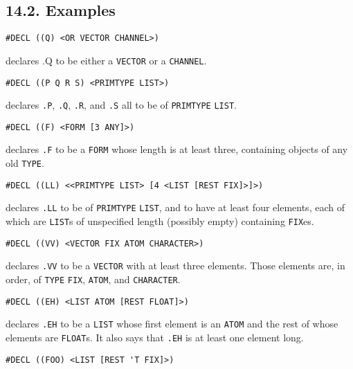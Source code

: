 \documentclass[a4paper,]{article}
\begin{document}
\subsection{14.2. Examples}\label{examples-3}

\begin{verbatim}
#DECL ((Q) <OR VECTOR CHANNEL>)
\end{verbatim}

declares .Q to be either a \texttt{VECTOR} or a \texttt{CHANNEL}.

\begin{verbatim}
#DECL ((P Q R S) <PRIMTYPE LIST>)
\end{verbatim}

declares \texttt{.P}, \texttt{.Q}, \texttt{.R}, and \texttt{.S} all to be of \texttt{PRIMTYPE} \texttt{LIST}.

\begin{verbatim}
#DECL ((F) <FORM [3 ANY]>)
\end{verbatim}

declares \texttt{.F} to be a \texttt{FORM} whose length is at least three, containing objects of any old \texttt{TYPE}.

\begin{verbatim}
#DECL ((LL) <<PRIMTYPE LIST> [4 <LIST [REST FIX]>]>)
\end{verbatim}

declares \texttt{.LL} to be of \texttt{PRIMTYPE} \texttt{LIST}, and to have at least four elements, each of which are
\texttt{LIST}s of unspecified length (possibly empty) containing \texttt{FIX}es.

\begin{verbatim}
#DECL ((VV) <VECTOR FIX ATOM CHARACTER>)
\end{verbatim}

declares \texttt{.VV} to be a \texttt{VECTOR} with at least three elements. Those elements are, in order, of \texttt{TYPE}
\texttt{FIX}, \texttt{ATOM}, and \texttt{CHARACTER}.

\begin{verbatim}
#DECL ((EH) <LIST ATOM [REST FLOAT]>)
\end{verbatim}

declares \texttt{.EH} to be a \texttt{LIST} whose first element is an \texttt{ATOM} and the rest of whose elements are
\texttt{FLOAT}s. It also says that \texttt{.EH} is at least one element long.

\begin{verbatim}
#DECL ((FOO) <LIST [REST 'T FIX]>)
\end{verbatim}
\end{document}
